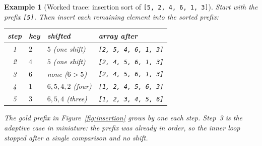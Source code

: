 \documentclass[11pt]{article}
\newtheorem{example}{Example}[section]
\begin{document}
\begin{example}[Worked trace: insertion sort of \texttt{[5, 2, 4, 6, 1, 3]}]
Start with the prefix \texttt{[5]}. Then insert each remaining element into the sorted prefix:

\begin{center}
{\footnotesize
\begin{tabular}{clll}
  \toprule
  \textbf{step} & \textbf{key} & \textbf{shifted} & \textbf{array after} \\
  \midrule
  1 & $2$ & $5$ (one shift) & \texttt{[2, 5, 4, 6, 1, 3]} \\
  2 & $4$ & $5$ (one shift) & \texttt{[2, 4, 5, 6, 1, 3]} \\
  3 & $6$ & none ($6 > 5$) & \texttt{[2, 4, 5, 6, 1, 3]} \\
  4 & $1$ & $6, 5, 4, 2$ (four) & \texttt{[1, 2, 4, 5, 6, 3]} \\
  5 & $3$ & $6, 5, 4$ (three) & \texttt{[1, 2, 3, 4, 5, 6]} \\
  \bottomrule
\end{tabular}}
\end{center}

The gold prefix in Figure~\ref{fig:insertion} grows by one each step. Step~3 is the adaptive case in miniature: the prefix was already in order, so the inner loop stopped after a single comparison and no shift.
\end{example}
\end{document}

